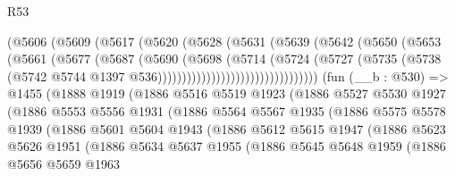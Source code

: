 \begin{lexlean}{R53}
\begin{coremodule}
                            (@5606
                              (@5609
                                (@5617
                                  (@5620
                                    (@5628
                                      (@5631
                                        (@5639
                                          (@5642
                                            (@5650
                                              (@5653
                                                (@5661
                                                  (@5677
                                                    (@5687
                                                      (@5690
                                                        (@5698
                                                          (@5714
                                                            (@5724
                                                              (@5727
                                                                (@5735
                                                                  (@5738
                                                                    (@5742
                                                                      @5744
                                                                      @1397
                                                                      @536)))))))))))))))))))))))))))))))))
    (fun (__b : @530) =>
    @1455
      (@1888
        @1919
        (@1886
          @5516
          @5519
          @1923
          (@1886
            @5527
            @5530
            @1927
            (@1886
              @5553
              @5556
              @1931
              (@1886
                @5564
                @5567
                @1935
                (@1886
                  @5575
                  @5578
                  @1939
                  (@1886
                    @5601
                    @5604
                    @1943
                    (@1886
                      @5612
                      @5615
                      @1947
                      (@1886
                        @5623
                        @5626
                        @1951
                        (@1886
                          @5634
                          @5637
                          @1955
                          (@1886
                            @5645
                            @5648
                            @1959
                            (@1886
                              @5656
                              @5659
                              @1963

\end{coremodule}
\end{lexlean}
